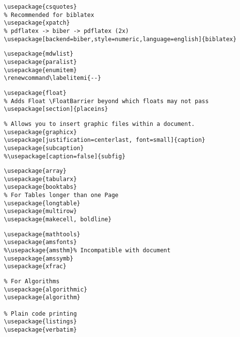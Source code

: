 \begin{lstlisting}[language={[LaTeX]TeX}, label=lst:Bibliography, basicstyle=\footnotesize]
%% Packages for Bibliography
\usepackage{csquotes}
% Recommended for biblatex
\usepackage{xpatch} 
% pdflatex -> biber -> pdflatex (2x)
\usepackage[backend=biber,style=numeric,language=english]{biblatex}
\end{lstlisting}

\begin{lstlisting}[language={[LaTeX]TeX}, label=lst:Lists, basicstyle=\footnotesize]
%% Lists
\usepackage{mdwlist}
\usepackage{paralist}
\usepackage{enumitem}
\renewcommand\labelitemi{--}
\end{lstlisting}


\begin{lstlisting}[language={[LaTeX]TeX}, label=lst:Float, basicstyle=\footnotesize]
%% Floats
\usepackage{float}
% Adds Float \FloatBarrier beyond which floats may not pass
\usepackage[section]{placeins}
\end{lstlisting}

\begin{lstlisting}[language={[LaTeX]TeX}, label=lst:Images, basicstyle=\footnotesize]
%% Images
% Allows you to insert graphic files within a document. 
\usepackage{graphicx}
\usepackage[justification=centerlast, font=small]{caption}
\usepackage{subcaption}
%\usepackage[caption=false]{subfig}
\end{lstlisting}

\begin{lstlisting}[language={[LaTeX]TeX}, label=lst:Tables, basicstyle=\footnotesize]
%% Tables
\usepackage{array}
\usepackage{tabularx}
\usepackage{booktabs}
% For Tables longer than one Page
\usepackage{longtable} 
\usepackage{multirow}
\usepackage{makecell, boldline}
\end{lstlisting}

\begin{lstlisting}[language={[LaTeX]TeX}, label=lst:Math, basicstyle=\footnotesize]
%% Math
\usepackage{mathtools}
\usepackage{amsfonts}
%\usepackage{amsthm}% Incompatible with document
\usepackage{amssymb}
\usepackage{xfrac}
\end{lstlisting}


\begin{lstlisting}[language={[LaTeX]TeX}, label=lst:Code, basicstyle=\footnotesize]
%% Code
% For Algorithms
\usepackage{algorithmic}
\usepackage{algorithm}

% Plain code printing
\usepackage{listings} 
\usepackage{verbatim}

\end{lstlisting}


